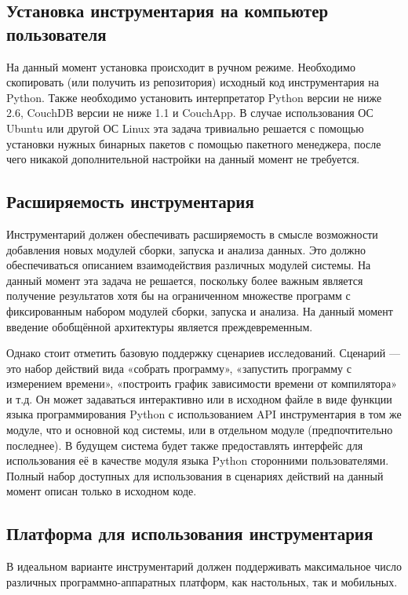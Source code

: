 \subsection{Установка инструментария на компьютер пользователя}
На данный момент установка происходит в ручном режиме. Необходимо скопировать (или получить из репозитория) исходный код инструментария на {Python}. Также необходимо установить интерпретатор {Python} версии не ниже 2.6, CouchDB версии не ниже 1.1 и CouchApp. В случае использования ОС Ubuntu или другой ОС Linux эта задача тривиально решается с помощью установки нужных бинарных пакетов с помощью пакетного менеджера, после чего никакой дополнительной настройки на данный момент не требуется.


\subsection{Расширяемость инструментария}
Инструментарий должен обеспечивать расширяемость в смысле возможности добавления новых модулей сборки, запуска и анализа данных. Это должно обеспечиваться описанием взаимодействия различных модулей системы. На данный момент эта задача не решается, поскольку более важным является получение результатов хотя бы на ограниченном множестве программ с фиксированным набором модулей сборки, запуска и анализа. На данный момент введение обобщённой архитектуры является преждевременным.

Однако стоит отметить базовую поддержку сценариев исследований. Сценарий --- это набор действий вида «собрать программу», «запустить программу с измерением времени», «построить график зависимости времени от компилятора» и т.д. Он может задаваться интерактивно или в исходном файле в виде функции языка программирования {Python} с использованием API инструментария в том же модуле, что и основной код системы, или в отдельном модуле (предпочтительно последнее). В будущем система будет также предоставлять интерфейс для использования её в качестве модуля языка {Python} сторонними пользователями. Полный набор доступных для использования в сценариях действий на данный момент описан только в исходном коде.

\subsection{Платформа для использования инструментария}
В идеальном варианте инструментарий должен поддерживать максимальное число различных программно-аппаратных платформ, как настольных, так и мобильных.

